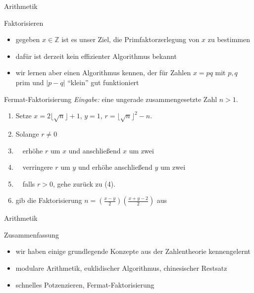 \documentclass[aspectratio=1610, 11pt]{beamer}
\newcommand\ZZ{\mathbb Z}
\newcommand\bc[1]{\left({#1}\right)}
\newcommand\bcfr[2]{\bc{\frac{#1}{#2}}}
\begin{document}
\begin{frame}{Arithmetik}
	\begin{overprint}
		\begin{exampleblock}{Faktorisieren}
			\begin{itemize}
				\item gegeben $x\in\ZZ$ ist es unser Ziel, die Primfaktorzerlegung von $x$ zu bestimmen
				\item daf\"ur ist derzeit kein effizienter Algorithmus bekannt
				\item wir lernen aber einen Algorithmus kennen, der f\"ur Zahlen $x=pq$ mit $p,q$ prim und $|p-q|$ ``klein'' gut funktioniert
			\end{itemize}
		\end{exampleblock}
		\begin{exampleblock}{Fermat-Faktorisierung}
	{\em Eingabe:} eine ungerade zusammengesetzte Zahl $n>1$.
	\begin{enumerate}
		\item Setze $x=2\lfloor\sqrt n\rfloor+1$, $y=1$, $r=\lfloor\sqrt n\rfloor^2-n$.
		\item Solange $r\neq0$
		\item $\quad$erh\"ohe $r$ um $x$ und anschlie\ss end $x$ um zwei
		\item $\quad$verringere $r$ um $y$ und erh\"ohe anschlie\ss end $y$ um zwei
		\item $\quad$falls $r>0$, gehe zur\"uck zu (4).
		\item gib die Faktorisierung $n=\bcfr{x-y}2\bcfr{x+y-2}2$ aus
	\end{enumerate}
		\end{exampleblock}
	\end{overprint}
\end{frame}

\begin{frame}{Arithmetik}
	\begin{exampleblock}{Zusammenfassung}
		\begin{itemize}
			\item wir haben einige grundlegende Konzepte aus der Zahlentheorie kennengelernt
			\item modulare Arithmetik, euklidischer Algorithmus, chinesischer Restsatz
			\item schnelles Potzenzieren, Fermat-Faktorisierung
		\end{itemize}
	\end{exampleblock}
\end{frame}

 
\end{document}
